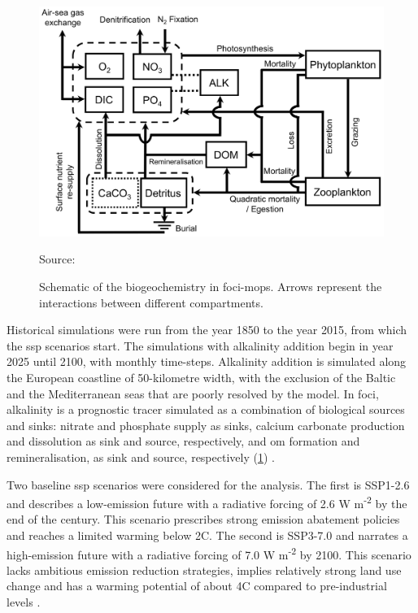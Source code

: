 \begin{figure}[H]
\caption[Schematic of the biogeochemistry in \texorpdfstring{FOCI}{FOCI}-\texorpdfstring{MOPS}{MOPS}.]{Schematic of the biogeochemistry in \ac{foci}-\ac{mops}. Arrows represent the interactions between different compartments.}
\label{foci-mops}
\centering
\includegraphics[width=12cm]{fig/1_Introduction/foci-mops.png}

\scriptsize Source: \cite{chien2022foci}
\end{figure}

Historical simulations were run from the year 1850 to the year 2015, from which the \ac{ssp} scenarios start. The simulations with alkalinity addition begin in year 2025 until 2100, with monthly time-steps. Alkalinity addition is simulated along the European coastline of 50-kilometre width, with the exclusion of the Baltic and the Mediterranean seas that are poorly resolved by the model. In \ac{foci}, alkalinity is a prognostic tracer simulated as a combination of biological sources and sinks: nitrate and phosphate supply as sinks, calcium carbonate production and dissolution as sink and source, respectively, and \ac{om} formation and remineralisation, as sink and source, respectively (\cref{foci-mops}) \citep{chen2021quantifying}. 

Two baseline \ac{ssp} scenarios were considered for the analysis. The first is SSP1-2.6 and describes a low-emission future with a radiative forcing of 2.6 W m\textsuperscript{-2} by the end of the century. This scenario prescribes strong emission abatement policies and reaches a limited warming below 2\textdegree C. The second is SSP3-7.0 and narrates a high-emission future with a radiative forcing of 7.0 W m\textsuperscript{-2} by 2100. This scenario lacks ambitious emission reduction strategies, implies relatively strong land use change and has a warming potential of about 4\textdegree C compared to pre-industrial levels \citep{o2016scenario}. 

